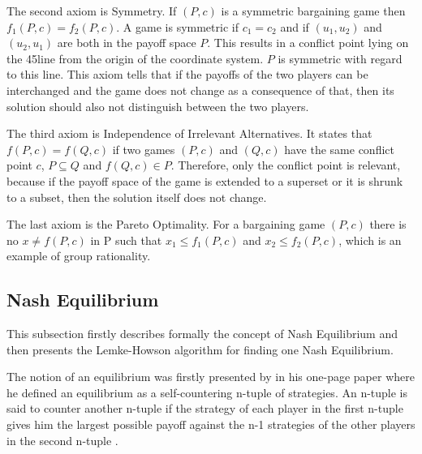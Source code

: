 {The second axiom is Symmetry. If $(P,c)$ is a symmetric bargaining game then $f_1(P,c) = f_2(P,c)$. A game is symmetric if $c_1 = c_2$ and if $(u_1, u_2)$ and $(u_2, u_1)$ are both in the payoff space $P$. This results in a conflict point lying on the 45\textdegree  line from the origin of the coordinate system. $P$ is symmetric with regard to this line. This axiom tells that if the payoffs of the two players can be interchanged and the game does not change as a consequence of that, then its solution should also not distinguish between the two players.

The third axiom is Independence of Irrelevant Alternatives. It states that $f(P,c) = f(Q,c)$ if two games $(P,c)$ and $(Q,c)$ have the same conflict point $c$, $P \subseteq Q$ and $f(Q,c) \in P$. Therefore, only the conflict point is relevant, because if the payoff space of the game is extended to a superset or it is shrunk to a subset, then the solution itself does not change.

The last axiom is the Pareto Optimality. For a bargaining game $(P,c)$ there is no $x \neq f(P,c)$ in P such that $x_1 \leq f_1(P,c)$ and $x_2 \leq f_2(P,c)$, which is an example of group rationality.

\subsection{Nash Equilibrium}
This subsection firstly describes formally the concept of Nash Equilibrium and then presents the Lemke-Howson algorithm for finding one Nash Equilibrium.

The notion of an equilibrium was firstly presented by \citet{nash1950equilibrium} in his one-page paper where he defined an equilibrium as a self-countering n-tuple of strategies. An n-tuple is said to counter another n-tuple if the strategy of each player in the first n-tuple gives him the largest possible payoff against the n-1 strategies of the other players in the second n-tuple \citep{nash1950equilibrium}. 

}
